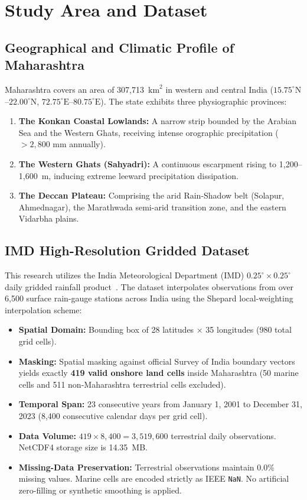 \documentclass[conference]{IEEEtran}
\begin{document}
\section{Study Area and Dataset}
\subsection{Geographical and Climatic Profile of Maharashtra}
Maharashtra covers an area of 307,713~$\text{km}^2$ in western and central India ($15.75^\circ\text{N}$--$22.00^\circ\text{N}$, $72.75^\circ\text{E}$--$80.75^\circ\text{E}$). The state exhibits three physiographic provinces:
\begin{enumerate}
    \item \textbf{The Konkan Coastal Lowlands:} A narrow strip bounded by the Arabian Sea and the Western Ghats, receiving intense orographic precipitation ($>2,800\text{ mm}$ annually).
    \item \textbf{The Western Ghats (Sahyadri):} A continuous escarpment rising to 1,200--1,600~m, inducing extreme leeward precipitation dissipation.
    \item \textbf{The Deccan Plateau:} Comprising the arid Rain-Shadow belt (Solapur, Ahmednagar), the Marathwada semi-arid transition zone, and the eastern Vidarbha plains.
\end{enumerate}

\subsection{IMD High-Resolution Gridded Dataset}
This research utilizes the India Meteorological Department (IMD) $0.25^\circ \times 0.25^\circ$ daily gridded rainfall product~\cite{pai2014development}. The dataset interpolates observations from over 6,500 surface rain-gauge stations across India using the Shepard local-weighting interpolation scheme:
\begin{itemize}
    \item \textbf{Spatial Domain:} Bounding box of 28 latitudes $\times$ 35 longitudes (980 total grid cells).
    \item \textbf{Masking:} Spatial masking against official Survey of India boundary vectors yields exactly \textbf{419 valid onshore land cells} inside Maharashtra (50 marine cells and 511 non-Maharashtra terrestrial cells excluded).
    \item \textbf{Temporal Span:} 23 consecutive years from January 1, 2001 to December 31, 2023 (8,400 consecutive calendar days per grid cell).
    \item \textbf{Data Volume:} $419 \times 8,400 = 3,519,600$ terrestrial daily observations. NetCDF4 storage size is 14.35~MB.
    \item \textbf{Missing-Data Preservation:} Terrestrial observations maintain 0.0\% missing values. Marine cells are encoded strictly as IEEE \texttt{NaN}. No artificial zero-filling or synthetic smoothing is applied.
\end{itemize}
\end{document}
